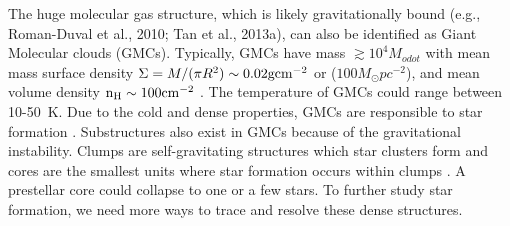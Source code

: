 The huge molecular gas structure, which is likely gravitationally bound (e.g., Roman-Duval et al., 2010; Tan et al.,
2013a), can also be identified as Giant Molecular clouds (GMCs). Typically, GMCs have mass $\gtrsim 10^4 M_{odot}$ with mean mass surface density $\Sigma = M/(\pi R^2) \sim 0.02 \rm gcm^{-2}$ or ($100 M_{\odot}pc^{-2}$), and mean volume density $\rm n_H \sim 100 cm^{-2}$ \cite{McKee2007, Tan2013}. The temperature of GMCs could range between 10-50~K. Due to the cold and dense properties, GMCs are responsible to star formation \cite{McKee2007, Kennicutt2012}. Substructures also exist in GMCs because of the gravitational instability. Clumps are self-gravitating structures which star clusters form \cite{Williams2000} and cores are the smallest units where star formation occurs within clumps \cite{Bergin2007, Tan2014}. A prestellar core could collapse to one or a few stars. To further study star formation, we need more ways to trace and resolve these dense structures.





